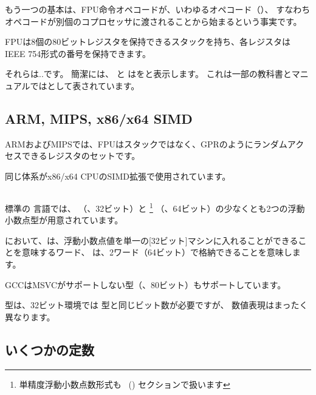 もう一つの基本は、\ac{FPU}命令オペコードが、いわゆるオペコード（）、
すなわちオペコードが別個のコプロセッサに渡されることから始まるという事実です。

\label{FPU_is_stack}

FPUは8個の80ビットレジスタを保持できるスタックを持ち、各レジスタは
IEEE 754\FNURLIEEE 形式の番号を保持できます。

それらは..です。 簡潔には、 \IDA と \olly はをと表示します。
これは一部の教科書とマニュアルではとして表されています。

\subsection{ARM, MIPS, x86/x64 SIMD}

ARMおよびMIPSでは、FPUはスタックではなく、\ac{GPR}のようにランダムアクセスできるレジスタのセットです。

同じ体系がx86/x64 CPUのSIMD拡張で使用されています。

\subsection{\CCpp}


標準の \CCpp 言語では、 \Tfloat （\FNURLSP、32ビット）と 
\footnote{単精度浮動小数点数形式も 
\IT{\WorkingWithFloatAsWithStructSubSubSectionName}~() セクションで扱います}
\Tdouble （\FNURLDP、64ビット）の少なくとも2つの浮動小数点型が用意されています。

において、は、浮動小数点値を単一の[32ビット]マシンに入れることができることを意味するワード、
は、2ワード（64ビット）で格納できることを意味します。


GCCはMSVCがサポートしない型（\FNURLEP、80ビット）もサポートしています。

\Tfloat 型は、32ビット環境では \Tint 型と同じビット数が必要ですが、
数値表現はまったく異なります。





\subsection{いくつかの定数}

